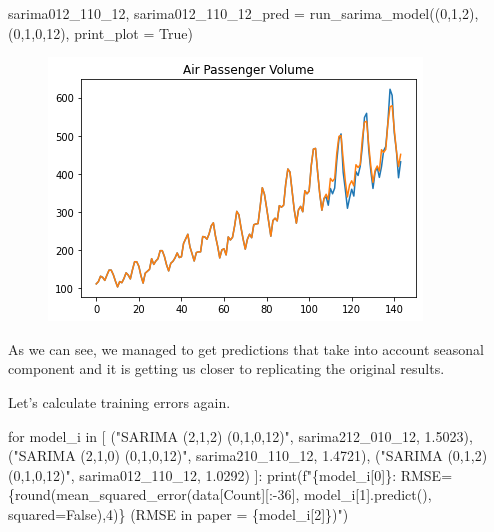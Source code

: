 \documentclass[
  letterpaper,
  DIV=11,
  numbers=noendperiod]{scrartcl}
\newenvironment{Shaded}{\begin{snugshade}}{\end{snugshade}}
\newcommand{\BuiltInTok}[1]{\textcolor[rgb]{0.00,0.23,0.31}{#1}}
\newcommand{\ControlFlowTok}[1]{\textcolor[rgb]{0.00,0.23,0.31}{#1}}
\newcommand{\DecValTok}[1]{\textcolor[rgb]{0.68,0.00,0.00}{#1}}
\newcommand{\FloatTok}[1]{\textcolor[rgb]{0.68,0.00,0.00}{#1}}
\newcommand{\KeywordTok}[1]{\textcolor[rgb]{0.00,0.23,0.31}{#1}}
\newcommand{\NormalTok}[1]{\textcolor[rgb]{0.00,0.23,0.31}{#1}}
\newcommand{\OperatorTok}[1]{\textcolor[rgb]{0.37,0.37,0.37}{#1}}
\newcommand{\SpecialCharTok}[1]{\textcolor[rgb]{0.37,0.37,0.37}{#1}}
\newcommand{\SpecialStringTok}[1]{\textcolor[rgb]{0.13,0.47,0.30}{#1}}
\newcommand{\StringTok}[1]{\textcolor[rgb]{0.13,0.47,0.30}{#1}}
\newcommand{\VariableTok}[1]{\textcolor[rgb]{0.07,0.07,0.07}{#1}}
\begin{document}
\begin{Shaded}
\begin{Highlighting}[]
\NormalTok{sarima012\_110\_12, sarima012\_110\_12\_pred }\OperatorTok{=}\NormalTok{ run\_sarima\_model((}\DecValTok{0}\NormalTok{,}\DecValTok{1}\NormalTok{,}\DecValTok{2}\NormalTok{), (}\DecValTok{0}\NormalTok{,}\DecValTok{1}\NormalTok{,}\DecValTok{0}\NormalTok{,}\DecValTok{12}\NormalTok{), print\_plot }\OperatorTok{=} \VariableTok{True}\NormalTok{)}
\end{Highlighting}
\end{Shaded}

\begin{figure}[H]

{\centering \includegraphics{main_files/figure-pdf/cell-31-output-1.png}

}

\end{figure}

As we can see, we managed to get predictions that take into account
seasonal component and it is getting us closer to replicating the
original results.

Let's calculate training errors again.

\begin{Shaded}
\begin{Highlighting}[]
\ControlFlowTok{for}\NormalTok{ model\_i }\KeywordTok{in}\NormalTok{ [}
\NormalTok{    (}\StringTok{"SARIMA (2,1,2) (0,1,0,12)"}\NormalTok{, sarima212\_010\_12, }\FloatTok{1.5023}\NormalTok{),}
\NormalTok{    (}\StringTok{"SARIMA (2,1,0) (0,1,0,12)"}\NormalTok{, sarima210\_110\_12, }\FloatTok{1.4721}\NormalTok{),}
\NormalTok{    (}\StringTok{"SARIMA (0,1,2) (0,1,0,12)"}\NormalTok{, sarima012\_110\_12, }\FloatTok{1.0292}\NormalTok{)}
\NormalTok{]:}
    \BuiltInTok{print}\NormalTok{(}\SpecialStringTok{f"}\SpecialCharTok{\{}\NormalTok{model\_i[}\DecValTok{0}\NormalTok{]}\SpecialCharTok{\}}\SpecialStringTok{: RMSE=}\SpecialCharTok{\{}\BuiltInTok{round}\NormalTok{(mean\_squared\_error(data[}\StringTok{\textquotesingle{}Count\textquotesingle{}}\NormalTok{][:}\OperatorTok{{-}}\DecValTok{36}\NormalTok{], model\_i[}\DecValTok{1}\NormalTok{].predict(), squared}\OperatorTok{=}\VariableTok{False}\NormalTok{),}\DecValTok{4}\NormalTok{)}\SpecialCharTok{\}}\SpecialStringTok{ (RMSE in paper = }\SpecialCharTok{\{}\NormalTok{model\_i[}\DecValTok{2}\NormalTok{]}\SpecialCharTok{\}}\SpecialStringTok{)"}\NormalTok{)}
    
\end{Highlighting}
\end{Shaded}
\end{document}
